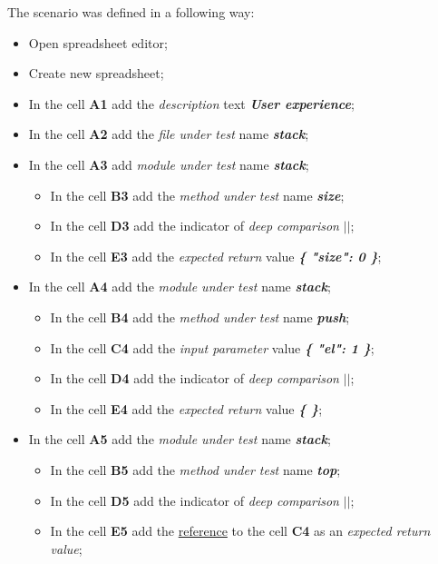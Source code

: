 The scenario was defined in a following way:
\begin{itemize}
	\item Open spreadsheet editor;
	\item Create new spreadsheet;
	\item In the cell \textbf{A1} add the \textit{description} text\textit{ \textbf{User experience}};
	\item In the cell \textbf{A2} add the \textit{file under test} name \textit{\textbf{stack}};
	\item In the cell \textbf{A3} add  \textit{module under test} name \textit{\textbf{stack}};
	\begin{itemize}
		\item In the cell \textbf{B3} add the \textit{method under test} name \textit{\textbf{size}};
		\item In the cell \textbf{D3} add the indicator of \textit{deep comparison}\textit{ \textbf{$||$}};
		\item In the cell \textbf{E3} add the \textit{expected return} value \textit{\textbf{\{ "size": 0 \}}};
	\end{itemize}
	\item In the cell \textbf{A4} add the \textit{module under test} name\textit{ \textbf{stack}};
	\begin{itemize}
		\item In the cell \textbf{B4} add the \textit{method under test} name  \textit{\textbf{push}};
		\item In the cell \textbf{C4} add the \textit{input parameter} value \textit{\textbf{ \{ "el": 1 \}}};
		\item In the cell \textbf{D4} add the indicator of \textit{deep comparison}\textit{ \textbf{$||$}};
		\item In the cell \textbf{E4} add the \textit{expected return} value\textit{ \textbf{\{ \}}};
	\end{itemize}
	\item In the cell \textbf{A5} add the  \textit{module under test} name \textit{ \textbf{stack}};
	\begin{itemize}
		\item In the cell \textbf{B5} add the \textit{method under test} name \textit{\textbf{top}};
		\item In the cell \textbf{D5} add the indicator of \textit{deep comparison}\textit{ \textbf{$||$}};
		\item In the cell \textbf{E5} add the \underline{reference} to the cell \textbf{C4} as an \textit{expected return value};

\end{itemize}
\end{itemize}
